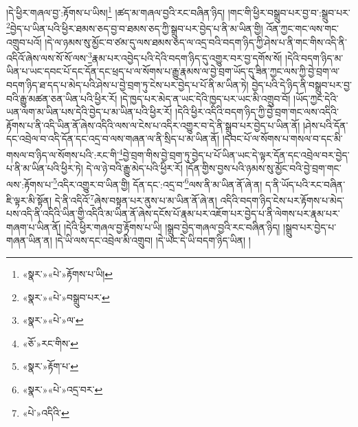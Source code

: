 །དེ་ཕྱིར་གཞལ་བྱ་:རྟོགས་པ་ཡིས།\footnote{«སྣར་»«པེ་»རྟོགས་པ་ཡི།} །ཚད་མ་གཞལ་བྱའི་རང་བཞིན་ཉིད། །གང་གི་ཕྱིར་བསྒྲུབ་པར་བྱ་བ་:སྒྲུབ་པར་\footnote{«སྣར་»«པེ་»བསྒྲུབ་པར་}བྱེད་པ་ཡིན་པའི་ཕྱིར་ཐམས་ཅད་བྱ་བ་ཐམས་ཅད་ཀྱི་སྒྲུབ་པར་བྱེད་པ་ནི་མ་ཡིན་གྱི། འོན་ཀྱང་གང་ལས་གང་འགྲུབ་པའོ། །དེ་ལ་ཉམས་སུ་མྱོང་བ་ཙམ་དུ་ལས་ཐམས་ཅད་ལ་འདྲ་བའི་བདག་ཉིད་ཀྱི་ཤེས་པ་ནི་གང་གིས་འདི་ནི་འདིའོ་ཞེས་ལས་སོ་སོ་ལས་\footnote{«སྣར་»«པེ་»ལ་}རྣམ་པར་འབྱེད་པའི་དེའི་བདག་ཉིད་དུ་འགྱུར་བར་བྱ་དགོས་སོ། །དེའི་བདག་ཉིད་མ་ཡིན་པ་ཡང་དབང་པོ་དང་དོན་དང་ཕྲད་པ་ལ་སོགས་པ་རྒྱུ་རྣམས་ལ་བྱེ་བྲག་ཡོད་དུ་ཟིན་ཀྱང་ལས་ཀྱི་བྱེ་བྲག་ལ་བདག་ཉིད་ཐ་དད་པ་མེད་པའི་ཤེས་པ་བྱེ་བྲག་ཏུ་ངེས་པར་བྱེད་པ་པོ་ནི་མ་ཡིན་ཏེ། བྱེད་པའི་དེ་ཉིད་ནི་བསྒྲུབ་པར་བྱ་བའི་རྒྱུ་མཚན་ཅན་ཡིན་པའི་ཕྱིར་རོ། །དེ་ཁྱད་པར་མེད་ན་ཡང་དེའི་ཁྱད་པར་ཡང་མི་འགྲུབ་བོ། །ཡོད་ཀྱང་དེའི་ཡན་ལག་མ་ཡིན་པས་དེའི་བྱེད་པ་མ་ཡིན་པའི་ཕྱིར་རོ། །དེའི་ཕྱིར་འདིའི་བདག་ཉིད་ཀྱི་བྱེ་བྲག་གང་ལས་འདིའི་རྟོགས་པ་ནི་འདི་ཡིན་ནོ་ཞེས་འདིའི་ལས་ལ་ངེས་པ་འདིར་འགྱུར་བ་དེ་ནི་སྒྲུབ་པར་བྱེད་པ་ཡིན་ནོ། །ཤེས་པའི་དོན་དང་འབྲེལ་བ་འདི་དོན་དང་འདྲ་བ་ལས་གཞན་ལ་ནི་སྲིད་པ་མ་ཡིན་ནོ། །དབང་པོ་ལ་སོགས་པ་གསལ་བ་དང་མི་གསལ་བ་ཉིད་ལ་སོགས་པའི་:རང་གི་\footnote{«ཅོ་»རང་གིས་}བྱེ་བྲག་གིས་བྱེ་བྲག་ཏུ་བྱེད་པ་པོ་ཡིན་ཡང་དེ་ལྟར་དོན་དང་འབྲེལ་བར་བྱེད་པ་ནི་མ་ཡིན་པའི་ཕྱིར་ཏེ། དེ་ལ་ཉེ་བའི་རྒྱུ་མེད་པའི་ཕྱིར་རོ། །དོན་གྱིས་བྱས་པའི་ཉམས་སུ་མྱོང་བའི་བྱེ་བྲག་གང་ལས་:རྟོགས་པ་\footnote{«སྣར་»རྟོག་པ་}འདིར་འགྱུར་བ་ཡིན་གྱི། དོན་དང་:འདྲ་བ་\footnote{«སྣར་»«པེ་»འདྲ་བར་}ལས་ནི་མ་ཡིན་ནོ་ཞེ་ན། ད་ནི་ཡོད་པའི་རང་བཞིན་ཇི་ལྟར་མི་སྟོན། དེ་ནི་འདིའོ་\footnote{«པེ་»འདིའི་}ཞེས་བསྟན་པར་ནུས་པ་མ་ཡིན་ནོ་ཞེ་ན། འདིའི་བདག་ཉིད་ངེས་པར་རྟོགས་པ་མེད་པས་འདི་ནི་འདིའི་ཡིན་གྱི་འདིའི་མ་ཡིན་ནོ་ཞེས་དངོས་པོ་རྣམ་པར་འཇོག་པར་བྱེད་པ་ནི་ལེགས་པར་རྣམ་པར་གཞག་པ་ཡིན་ནོ། །དེའི་ཕྱིར་གཞལ་བྱ་རྟོགས་པ་ཡི། །སྒྲུབ་བྱེད་གཞལ་བྱའི་རང་བཞིན་ཉིད། །སྒྲུབ་པར་བྱེད་པ་གཞན་ཡིན་ན། །དེ་ཡི་ལས་དང་འབྲེལ་མི་འགྲུབ། །དེ་ཡང་དེ་ཡི་བདག་ཉིད་ཡིན། །
